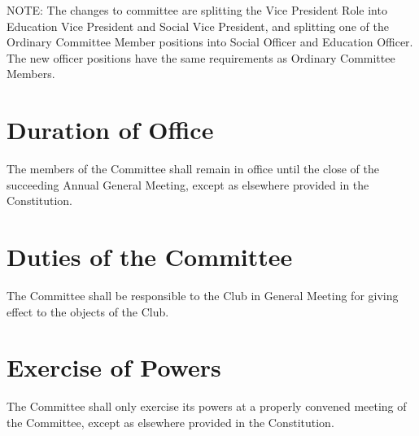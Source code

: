 \documentclass[11pt]{article} %
\begin{document}
{\color{Cyan}NOTE:
The changes to committee are splitting the Vice President Role into Education Vice President and Social Vice President, and splitting one of the Ordinary Committee Member positions into Social Officer and Education Officer.
The new officer positions have the same requirements as Ordinary Committee Members.
}

\section{Duration of Office}
The members of the Committee shall remain in office until the close of the succeeding Annual General Meeting, except as elsewhere provided in the Constitution.

\section{Duties of the Committee}
The Committee shall be responsible to the Club in General Meeting for giving effect to the objects of the Club.

\section{Exercise of Powers}
The Committee shall only exercise its powers at a properly convened meeting of the Committee, except as elsewhere provided in the Constitution.
\end{document}
